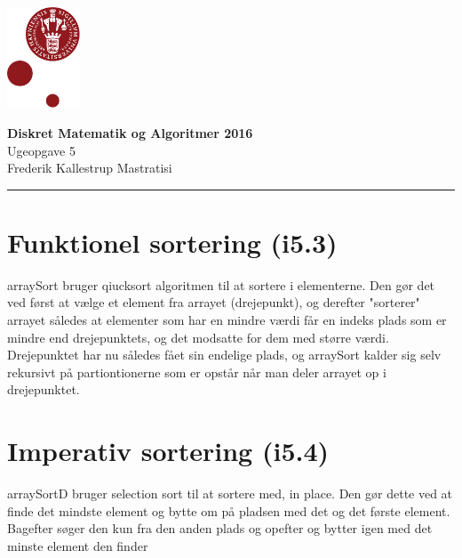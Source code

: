 \documentclass[12pt, a4paper, hidelinks]{article}
\begin{document}
\begin{minipage}[b]{1.0\linewidth}
\includegraphics[height=30mm]{KULogo}

\vspace*{-16ex}
\begin{center}
    {\Large \bf Diskret Matematik og Algoritmer 2016} \vspace*{1ex} \\
    {\large Ugeopgave 5} \vspace*{1ex} \\
    {\large Frederik Kallestrup Mastratisi}
\end{center}
\vspace*{-3pt}
{\color{KU-red}\hrule}
\end{minipage}
\vspace{2ex}

\tableofcontents \newpage

\setcounter{section}{0}
\setcounter{subsection}{-1}



\section{ Funktionel sortering (i5.3)}

arraySort bruger qiucksort algoritmen til at sortere i elementerne. Den gør det ved først at vælge et element fra arrayet (drejepunkt), og derefter "sorterer" arrayet således at elementer som har en mindre værdi får en indeks plads som er mindre end drejepunktets, og det modsatte for dem med større værdi. Drejepunktet har nu således fået sin endelige plads, og arraySort kalder sig selv rekursivt på partiontionerne som er opstår når man deler arrayet op i drejepunktet.

\section {Imperativ sortering (i5.4) }
arraySortD bruger selection sort til at sortere med, in place. Den gør dette ved at finde det mindste element og bytte om på pladsen med det og det første element. Bagefter søger den kun fra den anden plads og opefter og bytter igen med det minste element den finder





\end{document}
